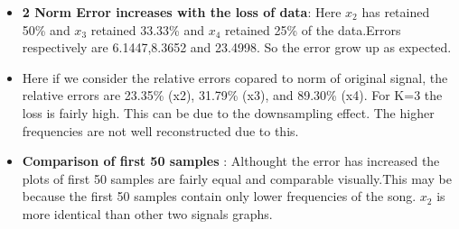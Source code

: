 \documentclass{article}
\begin{document}
\begin{itemize}
    \item \textbf{2 Norm Error increases with the loss of data}: Here $x_2$ has retained 50\% and $x_3$ retained 33.33\% and $x_4$ retained 25\% of the data.Errors respectively are 6.1447,8.3652 and 23.4998. So the error grow up as expected.
    \item Here if we consider the relative errors copared to norm of original signal, the relative errors are 23.35\% (x2), 31.79\% (x3), and 89.30\% (x4). For K=3 the loss is fairly high. This can be due to the downsampling effect. The higher frequencies are not well reconstructed due to this.
    \item \textbf{Comparison of first 50 samples} : Althought the error has increased the plots of first 50 samples are fairly equal and comparable visually.This may be because the first 50 samples contain only lower frequencies of the song. $x_2$ is more identical than other two signals graphs. 
    
\end{itemize}
\end{document}

